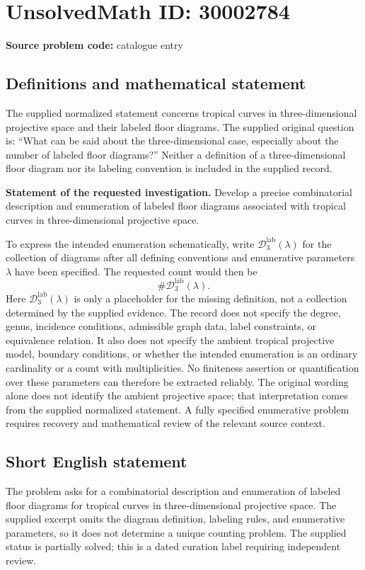 \documentclass[11pt]{article}
\begin{document}
\section*{UnsolvedMath ID: 30002784}
\textbf{Source problem code:} catalogue entry
\subsection{Definitions and mathematical statement}
The supplied normalized statement concerns tropical curves in three-dimensional projective space and their labeled floor diagrams. The supplied original question is: ``What can be said about the three-dimensional case, especially about the number of labeled floor diagrams?'' Neither a definition of a three-dimensional floor diagram nor its labeling convention is included in the supplied record.

\textbf{Statement of the requested investigation.} Develop a precise combinatorial description and enumeration of labeled floor diagrams associated with tropical curves in three-dimensional projective space.

To express the intended enumeration schematically, write \(\mathcal{D}^{\mathrm{lab}}_3(\lambda)\) for the collection of diagrams after all defining conventions and enumerative parameters \(\lambda\) have been specified. The requested count would then be
\[
\#\mathcal{D}^{\mathrm{lab}}_3(\lambda).
\]
Here \(\mathcal{D}^{\mathrm{lab}}_3(\lambda)\) is only a placeholder for the missing definition, not a collection determined by the supplied evidence. The record does not specify the degree, genus, incidence conditions, admissible graph data, label constraints, or equivalence relation. It also does not specify the ambient tropical projective model, boundary conditions, or whether the intended enumeration is an ordinary cardinality or a count with multiplicities. No finiteness assertion or quantification over these parameters can therefore be extracted reliably. The original wording alone does not identify the ambient projective space; that interpretation comes from the supplied normalized statement. A fully specified enumerative problem requires recovery and mathematical review of the relevant source context.
\subsection{Short English statement}
The problem asks for a combinatorial description and enumeration of labeled floor diagrams for tropical curves in three-dimensional projective space. The supplied excerpt omits the diagram definition, labeling rules, and enumerative parameters, so it does not determine a unique counting problem. The supplied status is partially solved; this is a dated curation label requiring independent review.
\end{document}
